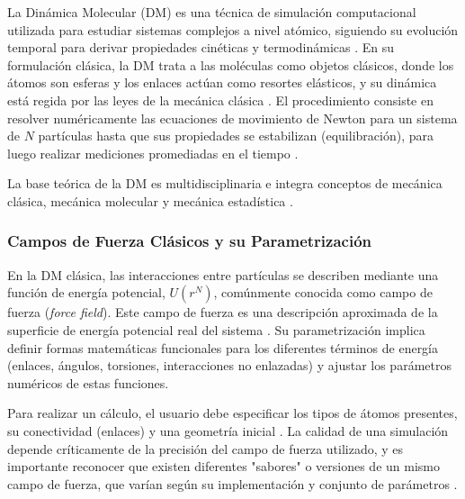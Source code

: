 La Dinámica Molecular (DM) es una técnica de simulación computacional utilizada para estudiar sistemas complejos a nivel atómico, siguiendo su evolución temporal para derivar propiedades cinéticas y termodinámicas \cite[2]{MD-2001-01}. En su formulación clásica, la DM trata a las moléculas como objetos clásicos, donde los átomos son esferas y los enlaces actúan como resortes elásticos, y su dinámica está regida por las leyes de la mecánica clásica \cite[2]{MD-2001-01}. El procedimiento consiste en resolver numéricamente las ecuaciones de movimiento de Newton para un sistema de $N$ partículas hasta que sus propiedades se estabilizan (equilibración), para luego realizar mediciones promediadas en el tiempo \cite[97]{frenkel2002understanding}.

La base teórica de la DM es multidisciplinaria e integra conceptos de mecánica clásica, mecánica molecular y mecánica estadística \cite[xxv]{zhou2022molecular}.

\subsubsection{Campos de Fuerza Clásicos y su Parametrización}
En la DM clásica, las interacciones entre partículas se describen mediante una función de energía potencial, $U(r^N)$, comúnmente conocida como campo de fuerza (\textit{force field}). Este campo de fuerza es una descripción aproximada de la superficie de energía potencial real del sistema \cite[53]{frenkel2002understanding}. Su parametrización implica definir formas matemáticas funcionales para los diferentes términos de energía (enlaces, ángulos, torsiones, interacciones no enlazadas) y ajustar los parámetros numéricos de estas funciones.

Para realizar un cálculo, el usuario debe especificar los tipos de átomos presentes, su conectividad (enlaces) y una geometría inicial \cite[69]{jensen2017introduction}. La calidad de una simulación depende críticamente de la precisión del campo de fuerza utilizado, y es importante reconocer que existen diferentes "sabores" o versiones de un mismo campo de fuerza, que varían según su implementación y conjunto de parámetros \cite[69]{jensen2017introduction}.

